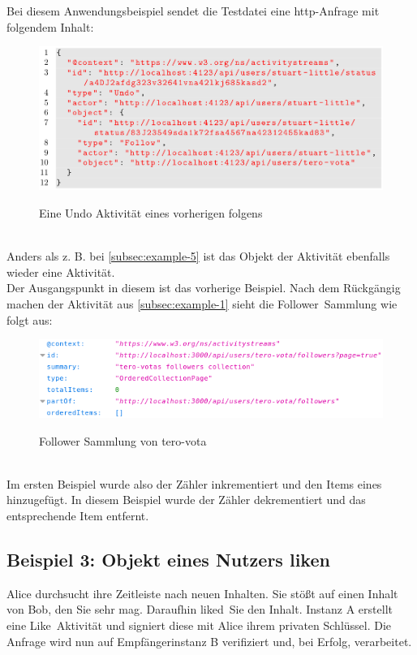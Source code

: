 Bei diesem Anwendungsbeispiel sendet die Testdatei eine \gls{http}-Anfrage mit folgendem Inhalt:
\begin{figure}[h]
	\centering
	\includegraphics[scale=0.45]{figures/undo-follow-activity.png}
	\label{fig:undo-follow-activity}
	\caption{Eine Undo Aktivität eines vorherigen folgens}
\end{figure}\\
Anders als z. B. bei \ref{subsec:example-5} ist das Objekt der Aktivität ebenfalls wieder eine Aktivität.\\

Der Ausgangspunkt in diesem ist das vorherige Beispiel. Nach dem Rückgängig machen der Aktivität aus \ref{subsec:example-1} sieht die \glqq Follower\grqq~Sammlung wie folgt aus:
\begin{figure}[h]
	\centering
	\includegraphics[scale=0.7]{figures/undo-follow-activity-result.png}
	\label{fig:undo-follow-activity-result}
	\caption{Follower Sammlung von tero-vota}
\end{figure}\\
Im ersten Beispiel wurde also der Zähler inkrementiert und den Items eines hinzugefügt. In diesem Beispiel wurde der Zähler dekrementiert und das entsprechende Item entfernt.
\subsection{
	\textbf{Beispiel 3}: Objekt eines Nutzers \glqq liken\grqq
}
Alice durchsucht ihre Zeitleiste nach neuen Inhalten. Sie stößt auf einen Inhalt von Bob, den Sie sehr mag. Daraufhin \glqq liked\grqq~Sie den Inhalt. Instanz A erstellt eine \glqq Like\grqq~Aktivität und signiert diese mit Alice ihrem privaten Schlüssel. Die Anfrage wird nun auf Empfängerinstanz B verifiziert und, bei Erfolg, verarbeitet.\\

